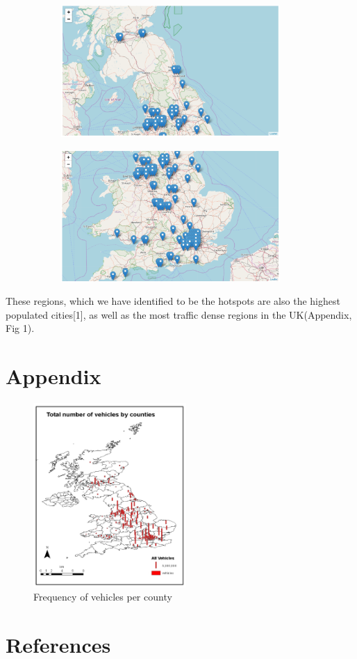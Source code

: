 \documentclass{neu_handout}
\begin{document}
\begin{figure}[H]
\begin{subfigure}[H]{0.45\linewidth}
\includegraphics[height=5cm,keepaspectratio]{map1.png}
\end{subfigure}
\begin{subfigure}[H]{0.45\linewidth}
\includegraphics[height=5cm,keepaspectratio]{map2.png}
\end{subfigure}%
\end{figure}

These regions, which we have identified to be the hotspots are also the highest populated cities[1], as well as the most traffic dense regions in the UK(Appendix, Fig 1).



\section{Appendix}

\begin{figure}[H]
    \begin{center}
      \includegraphics[height=7cm, keepaspectratio]{vehicles-by-county.png}
      \caption{Frequency of vehicles per county}
    \end{center}
\end{figure}


\section{References}
\end{document}
